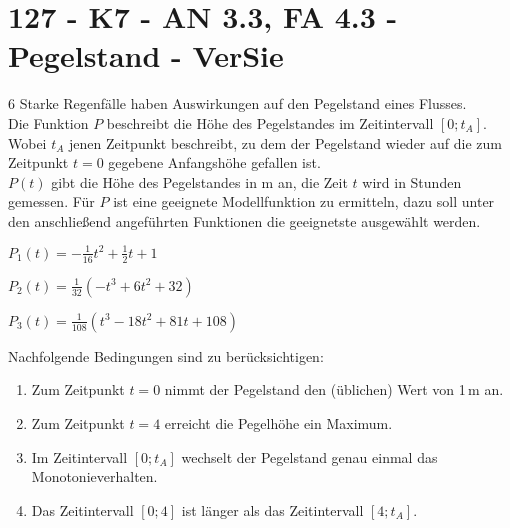 \section{127 - K7 - AN 3.3, FA 4.3 - Pegelstand - VerSie}

\begin{langesbeispiel} \item[6] %
Starke Regenfälle haben Auswirkungen auf den Pegelstand eines Flusses.\\
Die Funktion $P$ beschreibt die Höhe des Pegelstandes im Zeitintervall $[0;t_A]$. Wobei $t_A$ jenen Zeitpunkt beschreibt, zu dem der Pegelstand wieder auf die zum Zeitpunkt $t=0$ gegebene Anfangshöhe gefallen ist.\\
$P(t)$ gibt die Höhe des Pegelstandes in m an, die Zeit $t$ wird in Stunden gemessen. Für $P$ ist eine geeignete Modellfunktion zu ermitteln, dazu soll unter den anschließend angeführten Funktionen die geeignetste ausgewählt werden.

$P_1(t)=-\frac{1}{16}t^2+\frac{1}{2}t+1$

$P_2(t)=\frac{1}{32}(-t^3+6t^2+32)$

$P_3(t)=\frac{1}{108}(t^3-18t^2+81t+108)$\leer

Nachfolgende Bedingungen sind zu berücksichtigen:
\singlespacing
\begin{enumerate}[1)]
\item Zum Zeitpunkt $t=0$ nimmt der Pegelstand den (üblichen) Wert von 1\,m an.
\item Zum Zeitpunkt $t=4$ erreicht die Pegelhöhe ein Maximum.
\item Im Zeitintervall $[0;t_A]$ wechselt der Pegelstand genau einmal das Monotonieverhalten.
\item Das Zeitintervall $[0;4]$ ist länger als das Zeitintervall $[4;t_A]$.
\end{enumerate}
\onehalfspacing%

\begin{aufgabenstellung}
\item %



\end{aufgabenstellung}
\end{langesbeispiel}
